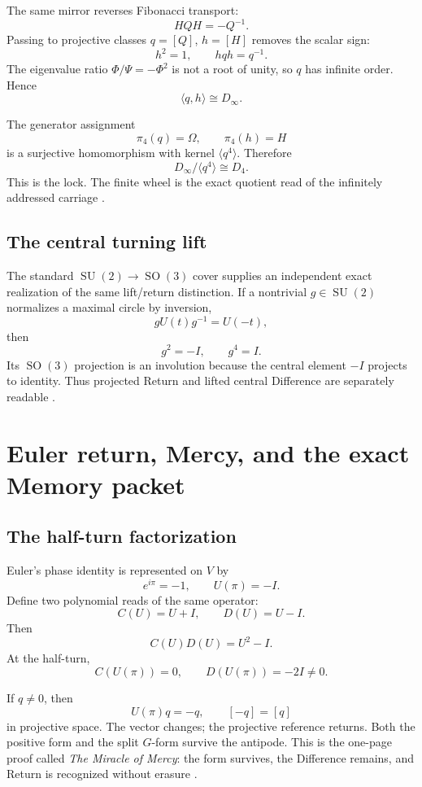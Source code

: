 \documentclass[11pt]{article}
\newcommand{\SO}{\operatorname{SO}}
\newcommand{\SU}{\operatorname{SU}}
\begin{document}
The same mirror reverses Fibonacci transport:
\[
HQH=-Q^{-1}.
\]
Passing to projective classes $q=[Q]$, $h=[H]$ removes the scalar sign:
\[
h^2=1,
\qquad
hqh=q^{-1}.
\]
The eigenvalue ratio $\Phi/\Psi=-\Phi^2$ is not a root of unity, so $q$ has infinite order. Hence
\[
\boxed{\langle q,h\rangle\cong D_\infty.}
\]

The generator assignment
\[
\pi_4(q)=\Omega,
\qquad
\pi_4(h)=H
\]
is a surjective homomorphism with kernel $\langle q^4\rangle$. Therefore
\[
\boxed{D_\infty/\langle q^4\rangle\cong D_4.}
\]
This is the lock. The finite wheel is the exact quotient read of the infinitely addressed carriage \cite{CoppaArchitectureSilence2026,CoppaMirrorEscapement2026}.

\subsection{The central turning lift}

The standard $\SU(2)\to\SO(3)$ cover supplies an independent exact realization of the same lift/return distinction. If a nontrivial $g\in\SU(2)$ normalizes a maximal circle by inversion,
\[
gU(t)g^{-1}=U(-t),
\]
then
\[
\boxed{g^2=-I,
\qquad
g^4=I.}
\]
Its $\SO(3)$ projection is an involution because the central element $-I$ projects to identity. Thus projected Return and lifted central Difference are separately readable \cite{CoppaDihedralPhase2026}.

\section{Euler return, Mercy, and the exact Memory packet}

\subsection{The half-turn factorization}

Euler's phase identity is represented on $V$ by
\[
e^{i\pi}=-1,
\qquad
U(\pi)=-I.
\]
Define two polynomial reads of the same operator:
\[
C(U)=U+I,
\qquad
D(U)=U-I.
\]
Then
\[
C(U)D(U)=U^2-I.
\]
At the half-turn,
\[
\boxed{C(U(\pi))=0,
\qquad
D(U(\pi))=-2I\neq0.}
\]

If $q\neq0$, then
\[
U(\pi)q=-q,
\qquad
[-q]=[q]
\]
in projective space. The vector changes; the projective reference returns. Both the positive form and the split $G$-form survive the antipode. This is the one-page proof called \emph{The Miracle of Mercy}: the form survives, the Difference remains, and Return is recognized without erasure \cite{CoppaMercy2026}.
\end{document}
